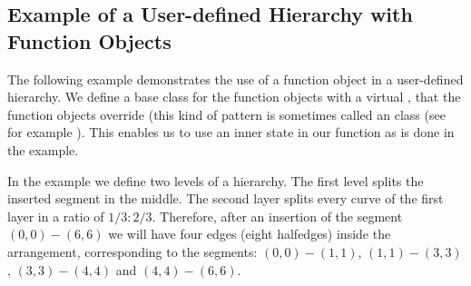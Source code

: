 \begin{ccAdvanced}

\subsection{Example of a User-defined Hierarchy with Function Objects}
\label{ssec:example5}

The following example demonstrates the use of a function object in
a user-defined hierarchy. We define a base class for the function objects
with a virtual , that the function objects override (this
kind of pattern is sometimes called an  class
(see for example \cite[Chapter~25.5]{s-cpl-97}). This enables us to
use an inner state in our function as is done in the example.

In the example we define two levels of a hierarchy. The first level
splits the inserted segment in the middle. The second layer splits every
curve of the first layer in a ratio of $1/3 : 2/3$. Therefore, after
an insertion of the segment $(0,0) - (6,6)$
we will have four edges (eight halfedges)
inside the arrangement, corresponding to the segments: $(0,0) - (1,1)$,
$(1,1) - (3,3)$, $(3,3) - (4,4)$ and $(4,4) - (6,6)$.


\end{ccAdvanced}

